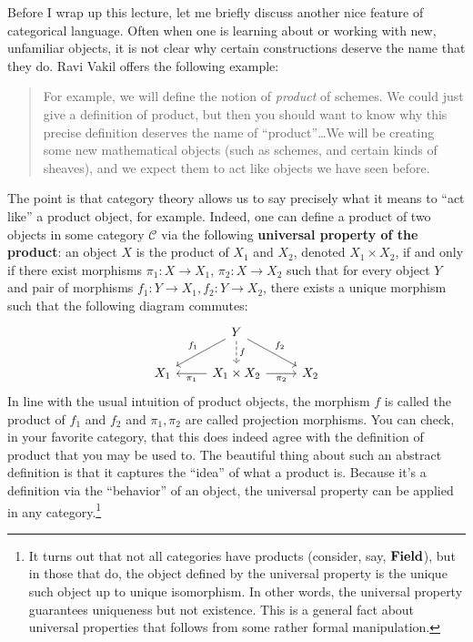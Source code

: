 \documentclass{../../mathnotes}
\begin{document}
Before I wrap up this lecture, let me briefly discuss another nice feature of categorical language. Often when one
is learning about or working with new, unfamiliar objects, it is not clear why certain constructions deserve the name
that they do. Ravi Vakil offers the following example:
\begin{quote}
    For example, we will define the notion of \emph{product} of schemes. We could just give a definition of product,
    but then you should want to know why this precise definition deserves the name of ``product''\dots We will be creating
    some new mathematical objects (such as schemes, and certain kinds of sheaves), and we expect them to act like objects
    we have seen before.
\end{quote}
The point is that category theory allows us to say precisely what it means to ``act like'' a product object, for example.
Indeed, one can define a product of two objects in some category $\mathcal{C}$ via the following \textbf{universal property of the product}:
an object $X$ is the product of $X_1$ and $X_2$, denoted $X_1\times X_2$, if and only if there exist morphisms $\pi_1:X\to X_1$,
$\pi_2:X\to X_2$ such that for every object $Y$ and pair of morphisms $f_1:Y\to X_1,f_2:Y\to X_2$, there exists a unique morphism
such that the following diagram commutes:
\begin{equation*}
    \begin{tikzcd}
        \;& Y\ar[swap]{dl}{f_1}\ar{dr}{f_2}\ar[dashed]{d}{f} &\\
        X_1 & X_1\times X_2\ar{l}{\pi_1}\ar[swap]{r}{\pi_2} & X_2
    \end{tikzcd}
\end{equation*}
In line with the usual intuition of product objects, the morphism $f$ is called the product of $f_1$ and $f_2$ and
$\pi_1,\pi_2$ are called projection morphisms. You can check, in your favorite category, that this does indeed agree with the
definition of product that you may be used to. The beautiful thing about such an abstract definition is that it captures
the ``idea'' of what a product is. Because it's a definition via the ``behavior'' of an object, the universal property
can be applied in any category.\footnote{It turns out that not all categories have products (consider, say, ${ \normalfont\textbf{Field}}$),
but in those that do, the object defined by the universal property is the unique such object up to unique isomorphism.
In other words, the universal property guarantees uniqueness but not existence. This is a general fact about universal properties
that follows from some rather formal manipulation.}
\end{document}
